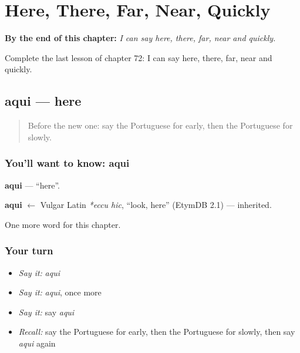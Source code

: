 
\chapter{Here, There, Far, Near, Quickly}
\label{ch:pt-here-there-far-near-quickly}

\begin{chapteropening}
\textbf{By the end of this chapter:} \emph{I can say here, there, far, near and quickly.}

Complete the last lesson of chapter 72: I can say here, there, far, near and quickly.
\end{chapteropening}

\section[aqui]{aqui — here}

\label{lesson:PT-C72-aqui}



\begin{quote}
Before the new one: say the Portuguese for early, then the Portuguese for slowly.
\end{quote}

\subsection*{You'll want to know: aqui}
\textbf{aqui} — \textquotedblleft{}here\textquotedblright{}.

\begin{cousinweb}
\textbf{aqui} $\leftarrow$ Vulgar Latin \emph{*eccu hic}, \textquotedblleft{}look, here\textquotedblright{} (EtymDB 2.1) — inherited.
\end{cousinweb}

\begin{grammarlens}[title={What you've built}]
One more word for this chapter.
\end{grammarlens}

\subsection*{Your turn}
\begin{itemize}
\raggedright
  \item \emph{Say it:} \emph{aqui}
  \item \emph{Say it:} \emph{aqui}, once more
  \item \emph{Say it:} say \emph{aqui}
  \item \emph{Recall:} say the Portuguese for early, then the Portuguese for slowly, then say \emph{aqui} again
\end{itemize}

